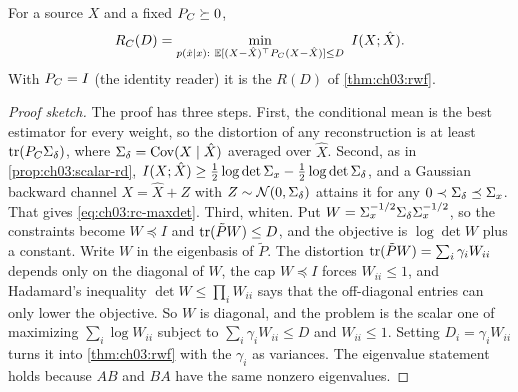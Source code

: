 \begin{definition}\label{def:ch03:rc}
For a source $X$ and a fixed $P_C\succeq0$,
\begin{equation}\label{eq:ch03:rc-def}
\RC(D)=\min_{p(\hat x\mid x):\ \E[(X-\hat X)\T\PC(X-\hat X)]\le D}\ \MI{X}{\hat X}.
\end{equation}
With $P_C=I$ (the identity reader) it is the $R(D)$ of \cref{thm:ch03:rwf}.
\end{definition}


\begin{proof}[Proof sketch]
The proof has three steps. First, the conditional mean is the best estimator for every weight, so the distortion of any reconstruction is at least $\operatorname{tr}(P_C\Sigma_\delta)$, where $\Sigma_\delta=\operatorname{Cov}(X\mid\hat X)$ averaged over $\hat X$. Second, as in \cref{prop:ch03:scalar-rd}, $I(X;\hat X)\ge\frac12\log\det\Sigma_x-\frac12\log\det\Sigma_\delta$, and a Gaussian backward channel $X=\hat X+Z$ with $Z\sim\mathcal{N}(0,\Sigma_\delta)$ attains it for any $0\prec\Sigma_\delta\preceq\Sigma_x$. That gives \eqref{eq:ch03:rc-maxdet}. Third, whiten. Put $W=\Sigma_x^{-1/2}\Sigma_\delta\Sigma_x^{-1/2}$, so the constraints become $W\preceq I$ and $\operatorname{tr}(\tilde PW)\le D$, and the objective is $\log\det W$ plus a constant. Write $W$ in the eigenbasis of $\tilde P$. The distortion $\operatorname{tr}(\tilde PW)=\sum_i\gamma_iW_{ii}$ depends only on the diagonal of $W$, the cap $W\preceq I$ forces $W_{ii}\le1$, and Hadamard's inequality $\det W\le\prod_iW_{ii}$ says that the off-diagonal entries can only lower the objective. So $W$ is diagonal, and the problem is the scalar one of maximizing $\sum_i\log W_{ii}$ subject to $\sum_i\gamma_iW_{ii}\le D$ and $W_{ii}\le1$. Setting $D_i=\gamma_iW_{ii}$ turns it into \cref{thm:ch03:rwf} with the $\gamma_i$ as variances. The eigenvalue statement holds because $AB$ and $BA$ have the same nonzero eigenvalues.
\end{proof}

